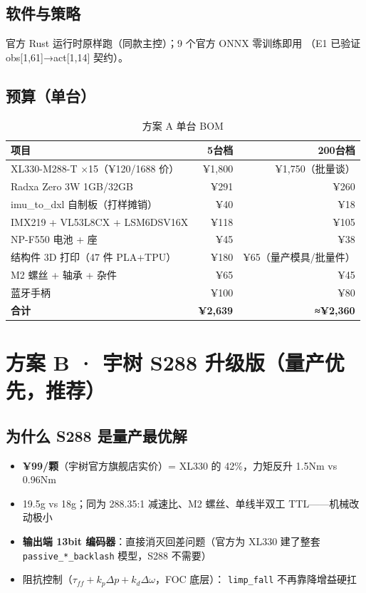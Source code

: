 \documentclass[11pt,a4paper]{ctexart}
\begin{document}
\subsection{软件与策略}
官方 Rust 运行时原样跑（同款主控）；9 个官方 ONNX 零训练即用
（E1 已验证 obs[1,61]→act[1,14] 契约）。
\subsection{预算（单台）}
\begin{table}[h]\centering\small
\begin{tabular}{@{}L{5.5cm}rr@{}}
\toprule
{} 项目 & 5台档 & 200台档\\
\midrule
XL330-M288-T ×15（¥120/1688 价） & ¥1{,}800 & ¥1{,}750（批量谈）\\
Radxa Zero 3W 1GB/32GB & ¥291 & ¥260\\
imu\_to\_dxl 自制板（打样摊销） & ¥40 & ¥18\\
IMX219 + VL53L8CX + LSM6DSV16X & ¥118 & ¥105\\
NP-F550 电池 + 座 & ¥45 & ¥38\\
结构件 3D 打印（47 件 PLA+TPU） & ¥180 & ¥65（量产模具/批量件）\\
M2 螺丝 + 轴承 + 杂件 & ¥65 & ¥45\\
蓝牙手柄 & ¥100 & ¥80\\
\midrule
\textbf{合计} & \textbf{¥2{,}639} & \textbf{≈¥2{,}360}\\
\bottomrule
\end{tabular}
\caption{方案 A 单台 BOM}
\end{table}

\section{方案 B · 宇树 S288 升级版（量产优先，推荐）}
\subsection{为什么 S288 是量产最优解}
\begin{itemize}\itemsep0pt
\item \textbf{¥99/颗}（宇树官方旗舰店实价）= XL330 的 42\%，力矩反升 1.5Nm vs 0.96Nm
\item 19.5g vs 18g；同为 288.35:1 减速比、M2 螺丝、单线半双工 TTL——机械改动极小
\item \textbf{输出端 13bit 编码器}：直接消灭回差问题（官方为 XL330 建了整套
  \texttt{passive\_*\_backlash} 模型，S288 不需要）
\item 阻抗控制（$\tau_{ff} + k_p\Delta p + k_d\Delta\omega$，FOC 底层）：
  \texttt{limp\_fall} 不再靠降增益硬扛
\end{itemize}
\end{document}
